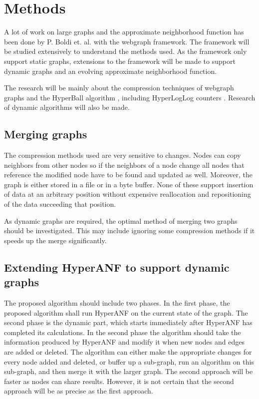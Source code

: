\chapter{Methods}


A lot of work on large graphs and the approximate neighborhood function has been done by P. Boldi et. al. with the webgraph framework\cite{webgraph}. The framework will be studied extensively to understand the methods used. As the framework only support static graphs, extensions to the framework will be made to support dynamic graphs and an evolving approximate neighborhood function. 

The research will be mainly about the compression techniques of webgraph graphs \cite{webgraph-compression} and the HyperBall algorithm \cite{hyperball}, including HyperLogLog counters \cite{hyperloglog}. Research of dynamic algorithms will also be made.


\section{Merging graphs}
The compression methods used are very sensitive to changes. Nodes can copy neighbors from other nodes so if the neighbors of a node change all nodes that reference the modified node have to be found and updated as well. Moreover, the graph is either stored in a file or in a byte buffer. None of these support insertion of data at an arbitrary position without expensive reallocation and repositioning of the data succeeding that position. 

As dynamic graphs are required, the optimal method of merging two graphs should be investigated. This may include ignoring some compression methods if it speeds up the merge significantly.


\section{Extending HyperANF to support dynamic graphs}
The proposed algorithm should include two phases. In the first phase, the proposed algorithm shall run HyperANF on the current state of the graph. The second phase is the dynamic part, which starts immediately after HyperANF has completed its calculations.  In the second phase the algorithm should take the information produced by HyperANF and modify it when new nodes and edges are added or deleted. The algorithm can either make the appropriate changes for every node added and deleted, or buffer up a sub-graph, run an algorithm on this sub-graph, and then merge it with the larger graph. The second approach will be faster as nodes can share results. However, it is not certain that the second approach will be as precise as the first approach. 

